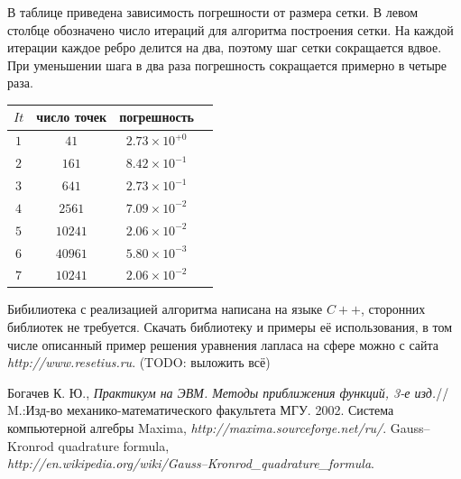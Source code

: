 \documentclass[a4paper,article]{article}
\begin{document}
В таблице приведена зависимость погрешности от размера сетки. В левом
столбце обозначено число итераций для алгоритма построения сетки. На
каждой итерации каждое ребро делится на два, поэтому шаг сетки
сокращается вдвое. При уменьшении шага в два раза погрешность
сокращается примерно в четыре раза.
\begin{center}
\begin{tabular}{| c | c | c | c |}
\hline
$It$ & число точек & погрешность \\
\hline
$1$ & $41$    & $2.73\times10^{+0}$   \\
$2$ & $161$   & $8.42\times10^{-1}$ \\
$3$ & $641$   & $2.73\times10^{-1}$ \\
$4$ & $2561$  & $7.09\times10^{-2}$ \\
$5$ & $10241$ & $2.06\times10^{-2}$ \\
$6$ & $40961$ & $5.80\times10^{-3}$ \\
$7$ & $10241$ & $2.06\times10^{-2}$ \\
\hline
\end{tabular}
\end{center}

Бибилиотека с реализацией алгоритма написана на языке $C++$,
сторонних библиотек не требуется. Скачать библиотеку и примеры её
использования, в том числе описанный пример решения уравнения лапласа на сфере можно с
сайта {\it http://www.resetius.ru}. (TODO: выложить всё)

\begin{thebibliography}{999}
 Богачев К. Ю., {\it  Практикум на ЭВМ.  Методы
    приближения функций, 3-е изд.}// M.:Изд-во
  механико-математического факультета МГУ. 2002.
 Система компьютерной алгебры Maxima, {\it http://maxima.sourceforge.net/ru/}.
Gauss–Kronrod quadrature formula, \\ {\it
  http://en.wikipedia.org/wiki/Gauss–Kronrod\_quadrature\_formula}. 
\end{thebibliography}
\end{document}
